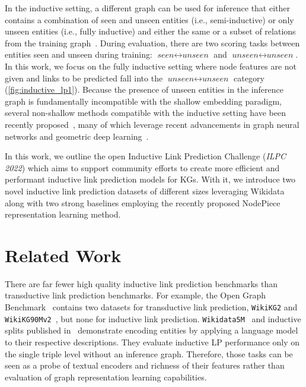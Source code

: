 \documentclass[sigconf,screen]{acmart}
\newcommand{\ilpc}{\textsl{\textsc{ILPC 2022}}\xspace}
\begin{document}
In the inductive setting, a different graph can be used for inference that either contains a combination of seen and unseen entities (i.e., semi-inductive) or only unseen entities (i.e., fully inductive) and either the same or a subset of relations from the training graph~\cite{ali2021improving}.
During evaluation, there are two scoring tasks between entities seen and unseen during training: $\textit{seen} \leftrightarrow \textit{unseen}$ and $\textit{unseen} \leftrightarrow \textit{unseen}$.
In this work, we focus on the fully inductive setting where node features are not given and links to be predicted fall into the $\textit{unseen} \leftrightarrow \textit{unseen}$ category (\autoref{fig:inductive_lp1}).
Because the presence of unseen entities in the inference graph is fundamentally incompatible with the shallow embedding paradigm, several non-shallow methods compatible with the inductive setting have been recently proposed~\cite{teru2020inductive,zhu2021neural,galkin2022nodepiece}, many of which leverage recent advancements in graph neural networks and geometric deep learning~\cite{bronstein2021geometric}.

In this work, we outline the open Inductive Link Prediction Challenge (\ilpc) which aims to support community efforts to create more efficient and performant inductive link prediction models for KGs.
With it, we introduce two novel inductive link prediction datasets of different sizes leveraging Wikidata~\cite{vrandevcic2014wikidata} along with two strong baselines employing the recently proposed NodePiece~\cite{galkin2022nodepiece} representation learning method. 


\section{Related Work}

There are far fewer high quality inductive link prediction benchmarks than transductive link prediction benchmarks.
For example, the Open Graph Benchmark~\cite{hu2020open} contains two datasets for transductive link prediction, \texttt{WikiKG2} and \texttt{WikiKG90Mv2}~\cite{hu2021ogblsc}, but none for inductive link prediction.
\texttt{Wikidata5M}~\cite{DBLP:journals/tacl/WangGZZLLT21} and inductive splits published in~\cite{daza2021inductive} demonstrate encoding entities by applying a language model to their respective descriptions. 
They evaluate inductive LP performance only on the single triple level without an inference graph. 
Therefore, those tasks can be seen as a probe of textual encoders and richness of their features rather than evaluation of graph representation learning capabilities. 
\end{document}
